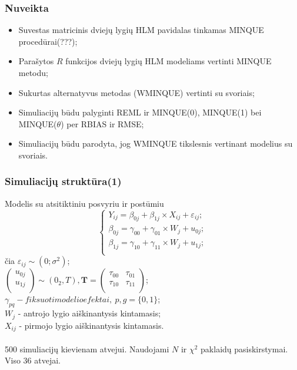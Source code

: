 \documentclass[utf8,hyperref={unicode,pdftex}]{beamer}
\begin{document}
\begin{frame}
\frametitle{Nuveikta}
\begin{itemize}
\item Suvestas matricinis dviejų lygių HLM pavidalas tinkamas MINQUE procedūrai(???);
\item Parašytos $R$ funkcijos dviejų lygių HLM modeliams vertinti MINQUE metodu;
\item Sukurtas alternatyvus metodas (WMINQUE) vertinti su svoriais;
\item Simuliacijų būdu palyginti REML ir MINQUE(0), MINQUE(1) bei MINQUE($\theta$) per RBIAS ir RMSE;
\item Simuliacijų būdu parodyta, jog WMINQUE tikslesnis vertinant modelius su svoriais.
\end{itemize}
\end{frame}
\begin{frame}
\frametitle{Simuliacijų struktūra(1)}
Modelis su atsitiktiniu posvyriu ir postūmiu
\begin{equation*} \label{eq:2lvldelpish}
\left\{
\begin{array}{l}
Y_{ij} = \beta_{0j}+ \beta_{1j}\times X_{ij}+\varepsilon_{ij}; \\
\beta_{0j} = \gamma_{00} +\gamma_{01}\times W_{j}+u_{0j};\\
\beta_{1j} = \gamma_{10} +\gamma_{11}\times W_{j}+u_{1j};\\
\end{array} \right.
\end{equation*}
čia 
$\varepsilon_{ij}\sim \left(0;\sigma^2\right)$;\\
$\begin{pmatrix}
u_{0j} \\
u_{1j} \\
\end{pmatrix}\sim \left(0_2, T\right), \mathbf{T}=\begin{pmatrix}
\tau_{00} & \tau_{01} \\
\tau_{10} & \tau_{11} \\
\end{pmatrix}$; \\
$\gamma_{pq} - fiksuoti modelio efektai,\ p,g = \{0,1\}$;\\
$W_j$ - antrojo lygio aiškinantysis kintamasis;\\
$X_{ij}$ - pirmojo lygio aiškinantysis kintamasis.\\ 
\ \\
500 simuliacijų kievienam atvejui. Naudojami $N$ ir $\chi^2$ paklaidų pasiskirstymai. Viso 36 atvejai.

\end{frame}
\end{document}
